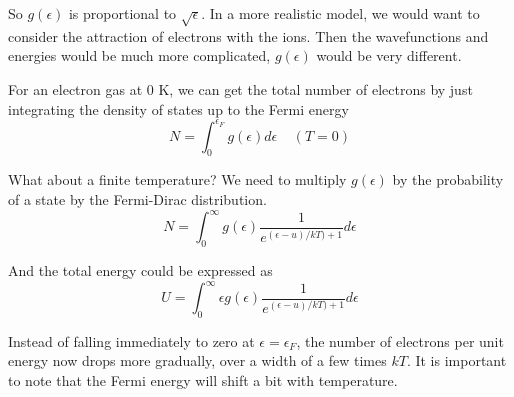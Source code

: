 So $g(\epsilon)$ is proportional to $\sqrt{\epsilon}$. In a more realistic model, we would want to consider the attraction of electrons with the ions.
Then the wavefunctions and energies would be much more complicated, $g(\epsilon)$ would be very different.

For an electron gas at 0 K, we can get the total number of electrons by just integrating the density of states up to the Fermi energy
\begin{equation}
N = \int_0 ^{\epsilon_{F}} g(\epsilon) d\epsilon~~~~~ (T=0)
\end{equation}

What about a finite temperature? We need to multiply $g(\epsilon)$ by the probability of a state by the Fermi-Dirac distribution.
\begin{equation}
N = \int_0 ^\infty g(\epsilon) \frac{1}{e^{(\epsilon-u)/kT)+1}} d\epsilon
\end{equation}

And the total energy could be expressed as 
\begin{equation}
U = \int_0 ^\infty \epsilon g(\epsilon) \frac{1}{e^{(\epsilon-u)/kT)+1}} d\epsilon
\end{equation}

Instead of falling immediately to zero at $\epsilon = \epsilon_F$, the number of electrons per unit energy now drops more gradually, over a width of a few times $kT$.
It is important to note that the Fermi energy will shift a bit with temperature.


